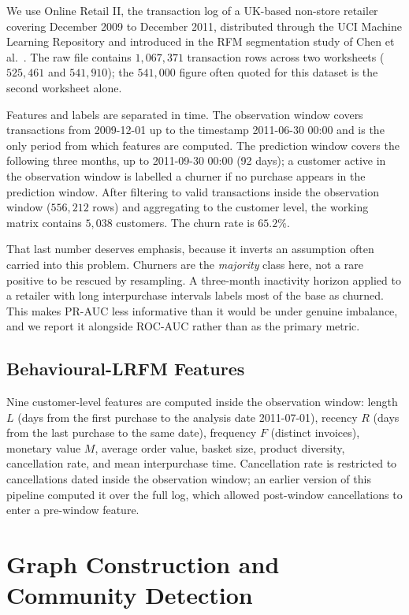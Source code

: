 \documentclass[runningheads]{llncs}
\begin{document}
We use Online Retail II, the transaction log of a UK-based non-store retailer
covering December 2009 to December 2011, distributed through the UCI Machine
Learning Repository \cite{uci2019onlineretail} and introduced in the RFM
segmentation study of Chen et al.\ \cite{chen2012datamining}. The raw file
contains $1{,}067{,}371$ transaction rows
across two worksheets ($525{,}461$ and $541{,}910$); the $541{,}000$ figure often
quoted for this dataset is the second worksheet alone.

Features and labels are separated in time. The observation window covers
transactions from 2009-12-01 up to the timestamp 2011-06-30 00:00 and is the
only period from which features are computed. The prediction window covers the
following three months, up to 2011-09-30 00:00 (92 days); a customer active in
the observation window is labelled a churner if no purchase appears in the
prediction window. After filtering to valid transactions inside the observation
window ($556{,}212$ rows) and aggregating to the customer level, the working
matrix contains $5{,}038$ customers. The churn rate is $65.2\%$.

That last number deserves emphasis, because it inverts an assumption often
carried into this problem. Churners are the \emph{majority} class here, not a
rare positive to be rescued by resampling. A three-month inactivity horizon
applied to a retailer with long interpurchase intervals labels most of the base
as churned.
This makes PR-AUC less informative than it would be under genuine imbalance, and
we report it alongside ROC-AUC rather than as the primary metric.

\subsection{Behavioural-LRFM Features}

Nine customer-level features are computed inside the observation window: length
$L$ (days from the first purchase to the analysis date 2011-07-01), recency $R$
(days from the last purchase to the same date), frequency $F$ (distinct
invoices), monetary value $M$, average order value, basket size, product
diversity, cancellation rate, and mean interpurchase time. Cancellation rate is
restricted to cancellations dated inside the observation window; an earlier
version of this pipeline computed it over the full log, which allowed
post-window cancellations to enter a pre-window feature.

\section{Graph Construction and Community Detection}
\end{document}
